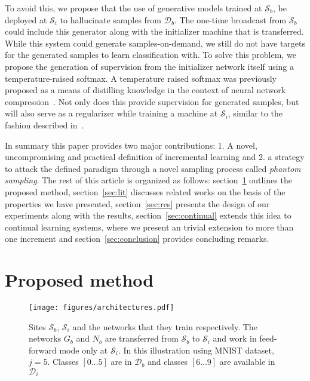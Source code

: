\documentclass[10pt,twocolumn,letterpaper]{article}
\def \cS{{\mathcal{S}}}
\def \cD{{\mathcal{D}}}
\begin{document}
	To avoid this, we propose that the use of generative models trained at $\cS_b$, be deployed at $\cS_i$ to hallucinate samples from $\cD_b$. 
	The one-time broadcast from $\cS_b$ could include this generator along with the initializer machine that is transferred. 
	While this system could generate samples-on-demand, we still do not have targets for the generated samples to learn classification with. 
	To solve this problem, we propose the generation of supervision from the initializer network itself using a temperature-raised softmax.
	A temperature raised softmax was previously proposed as a means of distilling knowledge in the context of neural network compression~\cite{hinton2015distilling}. 
	Not only does this provide supervision for generated samples, but will also serve as a regularizer while training a machine at $\cS_i$, similar to the fashion described in~\cite{hinton2015distilling}.
	
	In summary this paper provides two major contributions: 1. A novel, uncompromising and practical definition of incremental learning and 2. a strategy to attack the defined paradigm through a novel sampling process called \emph{phantom sampling}. The rest of this article is organized as follows: section~\ref{sec:proposed} outlines the proposed method, section~\ref{sec:lit} discusses related works on the basis of the properties we have presented, section~\ref{sec:res} presents the design of our experiments along with the results, section~\ref{sec:continual} extends this idea to continual learning systems, where we present an trivial extension to more than one increment and section~\ref{sec:conclusion} provides concluding remarks.
	
	
	
	
	
	
	
	
	
	
	
	
	\section{Proposed method}
	\label{sec:proposed}
	
	\begin{figure*}[!]
		\begin{center}
			\texttt{[image: figures/architectures.pdf]}
		\end{center}
		\caption{Sites $\cS_b$, $\cS_i$ and the networks that they train respectively. The networks $G_b$ and $N_b$ are transferred from $\cS_b$ to $\cS_i$ and work in feed-forward mode only at $\cS_i$. In this illustration using MNIST dataset, $j=5$. Classes $[0\hdots5]$ are in $\cD_b$ and classes $[6 \hdots 9]$ are available in $\cD_i$}
		\label{fig:proposed-architecture}
	\end{figure*}
	
\end{document}
